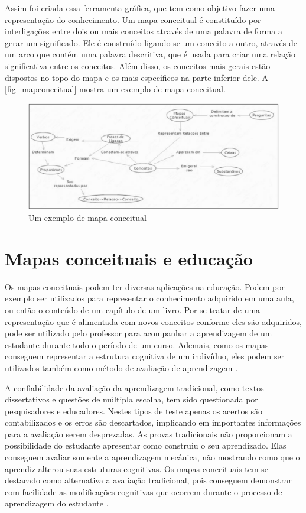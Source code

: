 \documentclass[
	12pt,				%
	openright,			%
	oneside,			%
	a4paper,			%
	english,			%
	french,				%
	spanish,			%
	brazil				%
	]{abntex2}
\begin{document}
Assim foi criada essa ferramenta gráfica, que tem como objetivo fazer uma representação do conhecimento. Um mapa conceitual é constituído por interligações entre dois ou mais conceitos através de uma palavra de forma a gerar um significado. Ele é construído ligando-se um conceito a outro, através de um arco que contém uma palavra descritiva, que é usada para criar uma relação significativa entre os conceitos. Além disso, os conceitos mais gerais estão dispostos no topo do mapa e os mais específicos na parte inferior dele. A \autoref{fig_mapconceitual} mostra um exemplo de mapa conceitual.
\begin{figure}[htb]
	\caption{\label{fig_mapconceitual}Um exemplo de mapa conceitual}
	\begin{center}
		\includegraphics[scale=0.3]{mapaconceitual.png}
	\end{center}
\end{figure}
\section{Mapas conceituais e educação}\label{sec-mapeduc}

Os mapas conceituais podem ter diversas aplicações na educação. Podem por exemplo ser utilizados para representar o conhecimento adquirido em uma aula, ou então o conteúdo de um capítulo de um livro. Por se tratar de uma representação que é alimentada com novos conceitos conforme eles são adquiridos, pode ser utilizado pelo professor para acompanhar a aprendizagem de um estudante durante todo o período de um curso. Ademais, como os mapas conseguem representar a estrutura cognitiva de um indivíduo, eles podem ser utilizados também como método de avaliação de aprendizagem \cite{Perin2014}.

A confiabilidade da avaliação da aprendizagem tradicional, como textos dissertativos e questões de múltipla escolha, tem sido questionada por pesquisadores e educadores. Nestes tipos de teste apenas os acertos são contabilizados e os erros são descartados, implicando em importantes informações para a avaliação serem desprezadas.
As provas tradicionais não proporcionam a possibilidade do estudante apresentar como construiu o seu aprendizado. Elas conseguem avaliar somente a aprendizagem mecânica, não mostrando como que o aprendiz alterou suas estruturas cognitivas.
Os mapas conceituais tem se destacado como alternativa a avaliação tradicional, pois conseguem demonstrar com facilidade as modificações cognitivas que ocorrem durante o processo de aprendizagem do estudante \cite{Dutra2002}.
\end{document}
